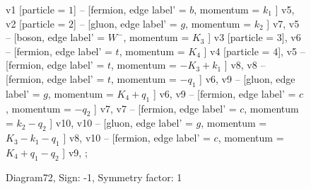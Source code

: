 \documentclass{revtex4}
\begin{document}
\begin{figure}[!htb]
\begin{center}
{    %
v1 [particle = \(1\)] -- [fermion, edge label' = \(b\), momentum = \(k_{1}\) ] v5, 
v2 [particle = \(2\)] -- [gluon, edge label' = \(g\), momentum = \(k_{2}\) ] v7, 
v5 -- [boson, edge label' = \(W^{-}\), momentum = \(K_{3}\) ] v3 [particle = \(3\)], 
v6 -- [fermion, edge label' = \(t\), momentum = \(K_{4}\) ] v4 [particle = \(4\)], 
v5 -- [fermion, edge label' = \(t\), momentum = \(-K_{3} + k_{1}\) ] v8, 
v8 -- [fermion, edge label' = \(t\), momentum = \(-q_{1}\) ] v6, 
v9 -- [gluon, edge label' = \(g\), momentum = \(K_{4} + q_{1}\) ] v6, 
v9 -- [fermion, edge label' = \(c\), momentum = \(-q_{2}\) ] v7, 
v7 -- [fermion, edge label' = \(c\), momentum = \(k_{2} - q_{2}\) ] v10, 
v10 -- [gluon, edge label' = \(g\), momentum = \(K_{3} - k_{1} - q_{1}\) ] v8, 
v10 -- [fermion, edge label' = \(c\), momentum = \(K_{4} + q_{1} - q_{2}\) ] v9, 
};
\end{center}
\caption{Diagram72, Sign: -1, Symmetry factor: 1}
\end{figure}
\newpage
\end{document}
